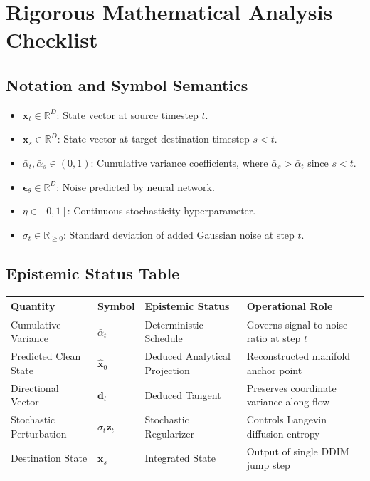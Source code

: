\documentclass[11pt,a4paper]{article}
\theoremstyle{definition}
\begin{document}
\section{Rigorous Mathematical Analysis Checklist}

\subsection{Notation and Symbol Semantics}
\begin{itemize}
    \item $\mathbf{x}_t \in \mathbb{R}^D$: State vector at source timestep $t$.
    \item $\mathbf{x}_s \in \mathbb{R}^D$: State vector at target destination timestep $s < t$.
    \item $\bar{\alpha}_t, \bar{\alpha}_s \in (0, 1)$: Cumulative variance coefficients, where $\bar{\alpha}_s > \bar{\alpha}_t$ since $s < t$.
    \item $\boldsymbol{\epsilon}_\theta \in \mathbb{R}^D$: Noise predicted by neural network.
    \item $\eta \in [0, 1]$: Continuous stochasticity hyperparameter.
    \item $\sigma_t \in \mathbb{R}_{\ge 0}$: Standard deviation of added Gaussian noise at step $t$.
\end{itemize}

\subsection{Epistemic Status Table}
\begin{table}[h]
\centering
\small
\begin{tabular}{@{}llll@{}}
\toprule
\textbf{Quantity} & \textbf{Symbol} & \textbf{Epistemic Status} & \textbf{Operational Role} \\
\midrule
Cumulative Variance & $\bar{\alpha}_t$ & Deterministic Schedule & Governs signal-to-noise ratio at step $t$ \\
Predicted Clean State & $\hat{\mathbf{x}}_0$ & Deduced Analytical Projection & Reconstructed manifold anchor point \\
Directional Vector & $\mathbf{d}_t$ & Deduced Tangent & Preserves coordinate variance along flow \\
Stochastic Perturbation & $\sigma_t \mathbf{z}_t$ & Stochastic Regularizer & Controls Langevin diffusion entropy \\
Destination State & $\mathbf{x}_s$ & Integrated State & Output of single DDIM jump step \\
\bottomrule
\end{tabular}
\end{table}
\end{document}

